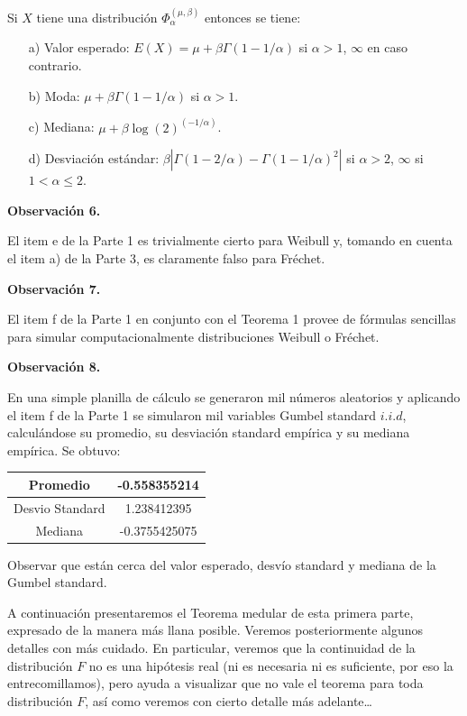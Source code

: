 \documentclass[
  oneside]{article}
\begin{document}
Si \(X\) tiene una distribución \(\Phi_{\alpha}^{(\mu, \beta)}\)
entonces se tiene:

\begin{itemize}
  \item[a)] Valor esperado: $E(X) = \mu + \beta\Gamma(1-1/\alpha)$ si $\alpha > 1$, $\infty$ en caso contrario.
  \item[b)] Moda: $\mu + \beta\Gamma(1-1/\alpha)$ si $\alpha>1$.
  \item[c)] Mediana: $\mu + \beta \log(2)^{(-1/\alpha)}$.
  \item[d)] Desviación estándar: $\beta|\Gamma(1-2/\alpha)-\Gamma(1-1/\alpha)^2|$ si $\alpha>2$, $\infty$ si $1<\alpha \leq 2$.
\end{itemize}

\textbf{Observación 6.}

El item e de la Parte 1 es trivialmente cierto para Weibull y, tomando
en cuenta el item a) de la Parte 3, es claramente falso para Fréchet.

\textbf{Observación 7.}

El item f de la Parte 1 en conjunto con el Teorema 1 provee de fórmulas
sencillas para simular computacionalmente distribuciones Weibull o
Fréchet.

\textbf{Observación 8.}

En una simple planilla de cálculo se generaron mil números aleatorios y
aplicando el item f de la Parte 1 se simularon mil variables Gumbel
standard \(i.i.d\), calculándose su promedio, su desviación standard
empírica y su mediana empírica. Se obtuvo:

\begin{table}[h]
\centering
\begin{tabular}{|c|c|}
\hline
Promedio & -0.558355214 \\ \hline
Desvio Standard & 1.238412395 \\ \hline
Mediana & -0.3755425075 \\ \hline
\end{tabular}
\end{table}

Observar que están cerca del valor esperado, desvío standard y mediana
de la Gumbel standard.

\newpage

A continuación presentaremos el Teorema medular de esta primera parte,
expresado de la manera más llana posible. Veremos posteriormente algunos
detalles con más cuidado. En particular, veremos que la continuidad de
la distribución \(F\) no es una hipótesis real (ni es necesaria ni es
suficiente, por eso la entrecomillamos), pero ayuda a visualizar que no
vale el teorema para toda distribución \(F\), así como veremos con
cierto detalle más adelante\ldots{}
\end{document}

